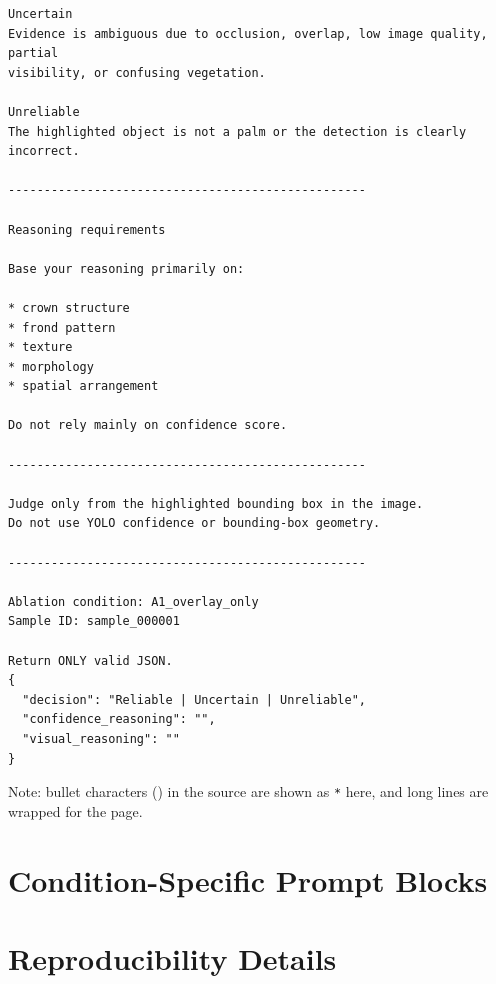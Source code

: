 \begin{footnotesize}
\begin{verbatim}
Uncertain
Evidence is ambiguous due to occlusion, overlap, low image quality, partial
visibility, or confusing vegetation.

Unreliable
The highlighted object is not a palm or the detection is clearly incorrect.

--------------------------------------------------

Reasoning requirements

Base your reasoning primarily on:

* crown structure
* frond pattern
* texture
* morphology
* spatial arrangement

Do not rely mainly on confidence score.

--------------------------------------------------

Judge only from the highlighted bounding box in the image.
Do not use YOLO confidence or bounding-box geometry.

--------------------------------------------------

Ablation condition: A1_overlay_only
Sample ID: sample_000001

Return ONLY valid JSON.
{
  "decision": "Reliable | Uncertain | Unreliable",
  "confidence_reasoning": "",
  "visual_reasoning": ""
}
\end{verbatim}
\end{footnotesize}
\noindent Note: bullet characters (\textbullet) in the source are shown as
\texttt{*} here, and long lines are wrapped for the page.

\section{Condition-Specific Prompt Blocks}
\label{app:prompt_blocks}

\section{Reproducibility Details}
\label{app:repro}

